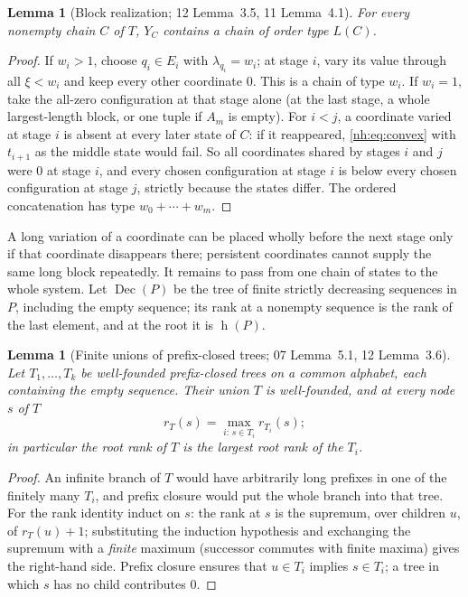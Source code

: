 \documentclass[11pt,a4paper]{article}
\newtheorem{lemma}[theorem]{Lemma}
\theoremstyle{definition}
\theoremstyle{remark}
\newcommand{\hgt}{\operatorname{h}}
\newcommand{\Dec}{\operatorname{Dec}}
\begin{document}
\begin{lemma}[Block realization; 12 Lemma~3.5, 11 Lemma~4.1]
\label{nh:lem:fixedlower}
For every nonempty chain $C$ of $T$, $Y_C$ contains a chain of order type
$L(C)$.
\end{lemma}
\begin{proof}
If $w_i>1$, choose $q_i\in E_i$ with $\lambda_{q_i}=w_i$; at stage $i$, vary its
value through all $\xi<w_i$ and keep every other coordinate $0$. This is a
chain of type $w_i$. If $w_i=1$, take the all-zero configuration at that
stage alone (at the last stage, a whole largest-length block, or one tuple
if $A_m$ is empty). For $i<j$, a coordinate varied at stage $i$ is absent at
every later state of $C$: if it reappeared, \eqref{nh:eq:convex} with
$t_{i+1}$ as the middle state would fail. So all coordinates shared by stages
$i$ and $j$ were $0$ at stage $i$, and every chosen configuration at stage $i$
is below every chosen configuration at stage $j$, strictly because the states
differ. The ordered concatenation has type $w_0+\cdots+w_m$.
\end{proof}

A long variation of a coordinate can be placed wholly before the next stage
only if that coordinate disappears there; persistent coordinates cannot supply
the same long block repeatedly. It remains to pass from one chain of states
to the whole system. Let $\Dec(P)$ be the tree of finite strictly decreasing
sequences in $P$, including the empty sequence; its rank at a nonempty
sequence is the rank of the last element, and at the root it is $\hgt(P)$.

\begin{lemma}[Finite unions of prefix-closed trees; 07 Lemma~5.1, 12 Lemma~3.6]
\label{nh:lem:treeunion}
Let $T_1,\dots,T_k$ be well-founded prefix-closed trees on a common alphabet,
each containing the empty sequence. Their union $T$ is well-founded, and at
every node $s$ of $T$
\[
 r_T(s)=\max_{i:\,s\in T_i}r_{T_i}(s);
\]
in particular the root rank of $T$ is the largest root rank of the $T_i$.
\end{lemma}
\begin{proof}
An infinite branch of $T$ would have arbitrarily long prefixes in one of the
finitely many $T_i$, and prefix closure would put the whole branch into that
tree. For the rank identity induct on $s$: the rank at $s$ is the supremum,
over children $u$, of $r_T(u)+1$; substituting the induction hypothesis and
exchanging the supremum with a \emph{finite} maximum (successor commutes with
finite maxima) gives the right-hand side. Prefix closure ensures that
$u\in T_i$ implies $s\in T_i$; a tree in which $s$ has no child contributes
$0$.
\end{proof}
\end{document}
